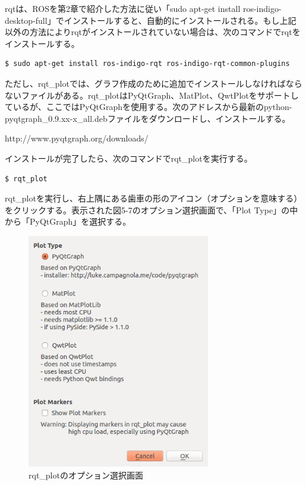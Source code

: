 rqtは、ROSを第2章で紹介した方法に従い「sudo apt-get install ros-indigo-desktop-full」でインストールすると、自動的にインストールされる。もし上記以外の方法によりrqtがインストールされていない場合は、次のコマンドでrqtをインストールする。

\vspace{\baselineskip}
\begin{lstlisting}[language=ROS]
$ sudo apt-get install ros-indigo-rqt ros-indigo-rqt-common-plugins
\end{lstlisting}

ただし、rqt\_plotでは、グラフ作成のために追加でインストールしなければならないファイルがある。rqt\_plotはPyQtGraph、MatPlot、QwtPlotをサポートしているが、ここではPyQtGraphを使用する。次のアドレスから最新のpython-pyqtgraph\_0.9.xx-x\_all.debファイルをダウンロードし、インストールする。

http://www.pyqtgraph.org/downloads/

インストールが完了したら、次のコマンドでrqt\_plotを実行する。

\vspace{\baselineskip}
\begin{lstlisting}[language=ROS]
$ rqt_plot
\end{lstlisting}

rqt\_plotを実行し、右上隅にある歯車の形のアイコン（オプションを意味する）をクリックする。表示された図5-7のオプション選択画面で、「Plot Type」の中から「PyQtGraph」を選択する。

\begin{figure}[h]
  \centering
  \includegraphics[width=8cm]{pictures/chapter5/pic_05_07.png}
  \caption{rqt\_plotのオプション選択画面}
\end{figure}

